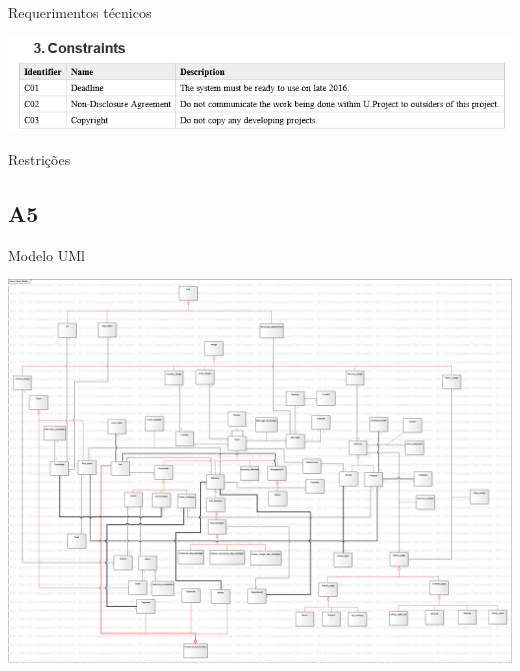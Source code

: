 \documentclass[11pt]{report}
\begin{document}
\caption{Requerimentos técnicos}

\includegraphics[width=1\linewidth]{Constraints.PNG} 

\caption{Restrições}


\subsection{A5}
\caption{Modelo UMl}
\linebreak
\includegraphics[width=1\linewidth]{Class_Model.png} 
\end{document}
